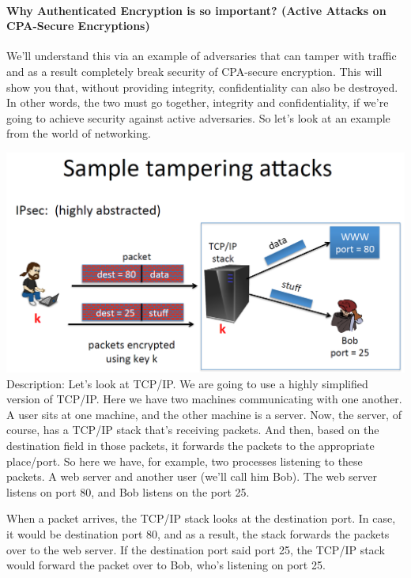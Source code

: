 \documentclass[11pt]{article}
\makeatletter
\def\maxwidth{\ifdim\Gin@nat@width>\linewidth\linewidth
    \else\Gin@nat@width\fi}
\let\Oldincludegraphics\includegraphics
\renewcommand{\includegraphics}[1]{\Oldincludegraphics[width=.8\maxwidth]{#1}}
\makeatother
\begin{document}
\hypertarget{why-authenticated-encryption-is-so-important-active-attacks-on-cpa-secure-encryptions}{%
\paragraph{Why Authenticated Encryption is so important? (Active Attacks
on CPA-Secure
Encryptions)}\label{why-authenticated-encryption-is-so-important-active-attacks-on-cpa-secure-encryptions}}

We'll understand this via an example of adversaries that can tamper with
traffic and as a result completely break security of CPA-secure
encryption. This will show you that, without providing integrity,
confidentiality can also be destroyed. In other words, the two must go
together, integrity and confidentiality, if we're going to achieve
security against active adversaries. So let's look at an example from
the world of networking.

\includegraphics{./Images/SampleTamperingAttack.png} Description: Let's
look at TCP/IP. We are going to use a highly simplified version of
TCP/IP. Here we have two machines communicating with one another. A user
sits at one machine, and the other machine is a server. Now, the server,
of course, has a TCP/IP stack that's receiving packets. And then, based
on the destination field in those packets, it forwards the packets to
the appropriate place/port. So here we have, for example, two processes
listening to these packets. A web server and another user (we'll call
him Bob). The web server listens on port 80, and Bob listens on the port
25.

When a packet arrives, the TCP/IP stack looks at the destination port.
In case, it would be destination port 80, and as a result, the stack
forwards the packets over to the web server. If the destination port
said port 25, the TCP/IP stack would forward the packet over to Bob,
who's listening on port 25.
\end{document}
